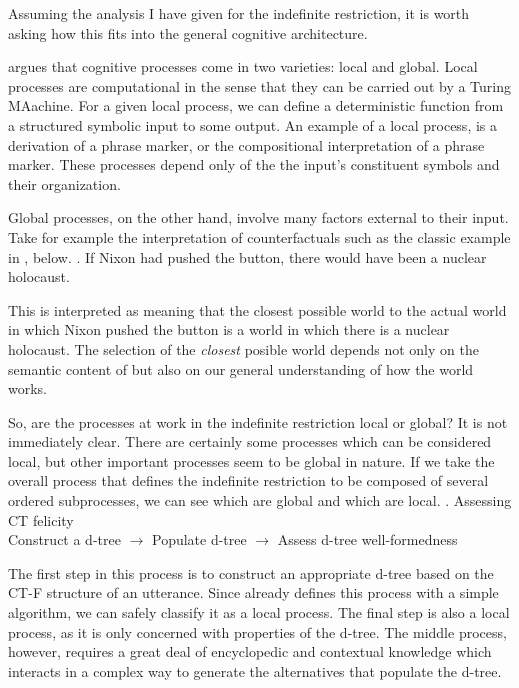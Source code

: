 \documentclass[GPFinal]{subfiles}
\begin{document}
Assuming the analysis I have given for the indefinite restriction, it is worth asking how this fits into the general cognitive architecture.

\textcite{fodor2001mind} argues that cognitive processes come in two varieties: local and global.
Local processes are computational in the sense that they can be carried out by a Turing MAachine.
For a given local process, we can define a deterministic function from a structured symbolic input to some output.
An example of a local process, is a derivation of a phrase marker, or the compositional interpretation of a phrase marker.
These processes depend only of the the input's constituent symbols and their organization.

Global processes, on the other hand, involve many factors external to their input.
Take for example the interpretation of counterfactuals such as the classic example in \Next, below.
\ex. If Nixon had pushed the button, there would have been a nuclear holocaust.\hfill <++>

This is interpreted as meaning that the closest possible world to the actual world in which Nixon pushed the button is a world in which there is a nuclear holocaust.
The selection of the \textit{closest} posible world depends not only on the semantic content of \Last but also on our general understanding of how the world works.

So, are the processes at work in the indefinite restriction local or global?
It is not immediately clear.
There are certainly some processes which can be considered local, but other important processes seem to be global in nature.
If we take the overall process that defines the indefinite restriction to be composed of several ordered subprocesses, we can see which are global and which are local.
\ex. Assessing CT felicity\\
Construct a d-tree $\rightarrow$ Populate d-tree $\rightarrow$ Assess d-tree well-formedness

The first step in this process is to construct an appropriate d-tree based on the CT-F structure of an utterance.
Since \textcite{buring2003d} already defines this process with a simple algorithm, we can safely classify it as a local process.
The final step is also a local process, as it is only concerned with properties of the d-tree.
The middle process, however, requires a great deal of encyclopedic and contextual knowledge which interacts in a complex way to generate the alternatives that populate the d-tree.
\end{document}
